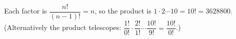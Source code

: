 Each factor is $\dfrac{n!}{(n-1)!}=n$, so the product is $1\cdot2\cdots10=10!=\boxed{3628800}$. (Alternatively the product telescopes: $\dfrac{1!}{0!}\cdot\dfrac{2!}{1!}\cdots\dfrac{10!}{9!}=\dfrac{10!}{0!}$.)
